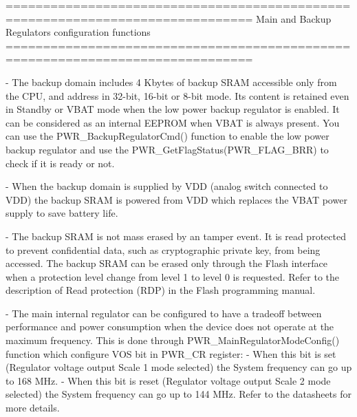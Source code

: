 \begin{DoxyVerb} ===============================================================================
                    Main and Backup Regulators configuration functions
 ===============================================================================  

 - The backup domain includes 4 Kbytes of backup SRAM accessible only from the 
   CPU, and address in 32-bit, 16-bit or 8-bit mode. Its content is retained 
   even in Standby or VBAT mode when the low power backup regulator is enabled. 
   It can be considered as an internal EEPROM when VBAT is always present.
   You can use the PWR_BackupRegulatorCmd() function to enable the low power
   backup regulator and use the PWR_GetFlagStatus(PWR_FLAG_BRR) to check if it is
   ready or not. 

 - When the backup domain is supplied by VDD (analog switch connected to VDD) 
   the backup SRAM is powered from VDD which replaces the VBAT power supply to 
   save battery life.

 - The backup SRAM is not mass erased by an tamper event. It is read protected 
   to prevent confidential data, such as cryptographic private key, from being 
   accessed. The backup SRAM can be erased only through the Flash interface when
   a protection level change from level 1 to level 0 is requested. 
   Refer to the description of Read protection (RDP) in the Flash programming manual.

 - The main internal regulator can be configured to have a tradeoff between performance
   and power consumption when the device does not operate at the maximum frequency. 
   This is done through PWR_MainRegulatorModeConfig() function which configure VOS bit
   in PWR_CR register: 
      - When this bit is set (Regulator voltage output Scale 1 mode selected) the System
        frequency can go up to 168 MHz. 
      - When this bit is reset (Regulator voltage output Scale 2 mode selected) the System
        frequency can go up to 144 MHz. 
   Refer to the datasheets for more details.\end{DoxyVerb}
 

